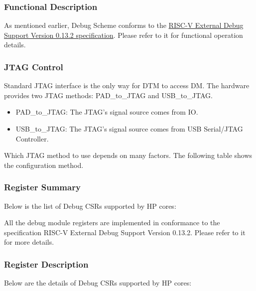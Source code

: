 \documentclass[main\_\_EN.tex]{subfiles}
\begin{document}
\subsubsection{Functional Description}
\label{sec:riscvcpu-dbg-func-descr}

As mentioned earlier, Debug Scheme conforms to the \href{https://riscv.org/wp-content/uploads/2019/03/riscv-debug-release.pdf} {RISC-V External Debug Support Version 0.13.2 specification}. Please refer to it for functional operation details.

\subsubsection{JTAG Control}
\label{sec:riscvcpu-dbg-jtag-cntl}

Standard JTAG interface is the only way for DTM to access DM. The hardware provides two JTAG methods: PAD\_to\_JTAG and USB\_to\_JTAG.

\begin{itemize}
    \item {PAD\_to\_JTAG: The JTAG's signal source comes from IO.}
    \item {USB\_to\_JTAG: The JTAG's signal source comes from USB Serial/JTAG Controller.}
\end{itemize}

Which JTAG method to use depends on many factors. The following table shows the configuration method.






\hypertarget{riscvcpu-dbg-reg-summ}{}
\subsubsection{Register Summary}
\label{sec:riscvcpu-dbg-reg-summ}

Below is the list of Debug CSRs supported by HP cores:


All the debug module registers are implemented in conformance to the specification RISC-V External Debug Support Version 0.13.2. Please refer to it for more details.



\subsubsection{Register Description}
Below are the details of Debug CSRs supported by HP cores:
\end{document}
